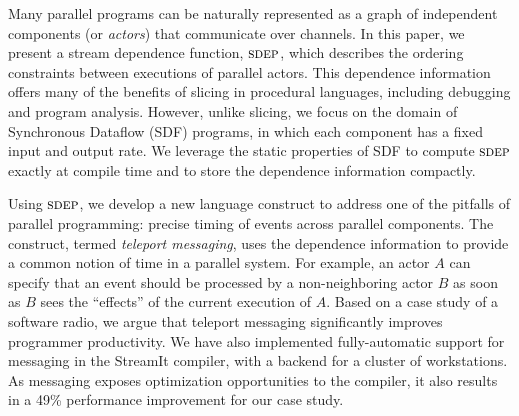 Many parallel programs can be naturally represented as a graph of
independent components (or {\it actors}) that communicate over
channels.  In this paper, we present a stream dependence
function, $\textsc{sdep}$, which describes the ordering constraints between
executions of parallel actors.  This dependence information offers
many of the benefits of slicing in procedural languages, including
debugging and program analysis.  However, unlike slicing, we focus on
the domain of Synchronous Dataflow (SDF) programs, in which each
component has a fixed input and output rate.  We leverage the static
properties of SDF to compute $\textsc{sdep}$ exactly at compile time and to
store the dependence information compactly.

Using $\textsc{sdep}$, we develop a new language construct to address one of
the pitfalls of parallel programming: precise timing of events across
parallel components.  The construct, termed {\it teleport messaging},
uses the dependence information to provide a common notion of time in
a parallel system.  For example, an actor $A$ can specify that an
event should be processed by a non-neighboring actor $B$ as soon as
$B$ sees the ``effects'' of the current execution of $A$.  Based on a
case study of a software radio, we argue that teleport messaging
significantly improves programmer productivity. We have also
implemented fully-automatic support for messaging in the StreamIt
compiler, with a backend for a cluster of workstations.  As messaging
exposes optimization opportunities to the compiler, it also results in
a 49\% performance improvement for our case study.

